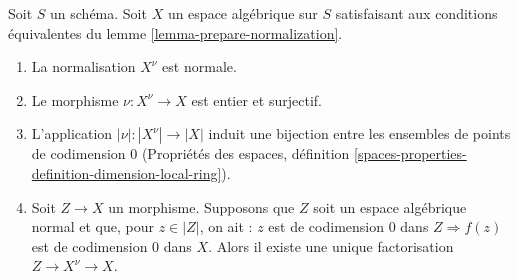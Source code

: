 \begin{lemma}
\label{lemma-normalization-normal}
Soit $S$ un schéma. Soit $X$ un espace algébrique sur $S$ satisfaisant aux
conditions équivalentes du lemme \ref{lemma-prepare-normalization}.
\begin{enumerate}
\item La normalisation $X^\nu$ est normale.
\item Le morphisme $\nu : X^\nu \to X$ est entier et surjectif.
\item L'application $|\nu| : |X^\nu| \to |X|$ induit une bijection entre
les ensembles de points de codimension $0$ (Propriétés des espaces,
définition \ref{spaces-properties-definition-dimension-local-ring}).
\item Soit $Z \to X$ un morphisme. Supposons que $Z$ soit un espace algébrique normal
et que, pour $z \in |Z|$, on ait : $z$ est de codimension $0$ dans
$Z \Rightarrow f(z)$ est de codimension $0$ dans $X$. Alors
il existe une unique factorisation $Z \to X^\nu \to X$.
\end{enumerate}
\end{lemma}

